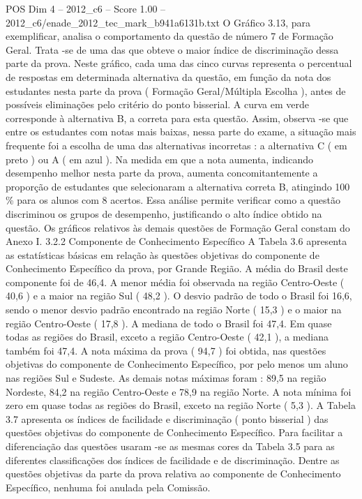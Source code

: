 \begin{textsample}{POS Dim 4 – 2012\_c6 – Score 1.00 – 2012\_c6/enade\_2012\_tec\_mark\_b941a6131b.txt}
O Gráfico 3.13, para exemplificar, analisa o comportamento da questão de número 7 de Formação Geral.
Trata -se de uma das que obteve o maior índice de discriminação dessa parte da prova.
Neste gráfico, cada uma das cinco curvas representa o percentual de respostas em determinada alternativa da questão, em função da nota dos estudantes nesta parte da prova ( Formação Geral/Múltipla Escolha ), antes de possíveis eliminações pelo critério do ponto bisserial.
A curva em verde corresponde à alternativa B, a correta para esta questão.
Assim, observa -se que entre os estudantes com notas mais baixas, nessa parte do exame, a situação mais frequente foi a escolha de uma das alternativas incorretas : a alternativa C ( em preto ) ou A ( em azul ).
Na medida em que a nota aumenta, indicando desempenho melhor nesta parte da prova, aumenta concomitantemente a proporção de estudantes que selecionaram a alternativa correta B, atingindo 100 \% para os alunos com 8 acertos.
Essa análise permite verificar como a questão discriminou os grupos de desempenho, justificando o alto índice obtido na questão.
Os gráficos relativos às demais questões de Formação Geral constam do Anexo I. 3.2.2 Componente de Conhecimento Específico A Tabela 3.6 apresenta as estatísticas básicas em relação às questões objetivas do componente de Conhecimento Específico da prova, por Grande Região.
A média do Brasil deste componente foi de 46,4.
A menor média foi observada na região Centro-Oeste ( 40,6 ) e a maior na região Sul ( 48,2 ).
O desvio padrão de todo o Brasil foi 16,6, sendo o menor desvio padrão encontrado na região Norte ( 15,3 ) e o maior na região Centro-Oeste ( 17,8 ).
A mediana de todo o Brasil foi 47,4.
Em quase todas as regiões do Brasil, exceto a região Centro-Oeste ( 42,1 ), a mediana também foi 47,4.
A nota máxima da prova ( 94,7 ) foi obtida, nas questões objetivas do componente de Conhecimento Específico, por pelo menos um aluno nas regiões Sul e Sudeste.
As demais notas máximas foram : 89,5 na região Nordeste, 84,2 na região Centro-Oeste e 78,9 na região Norte.
A nota mínima foi zero em quase todas as regiões do Brasil, exceto na região Norte ( 5,3 ).
A Tabela 3.7 apresenta os índices de facilidade e discriminação ( ponto bisserial ) das questões objetivas do componente de Conhecimento Específico.
Para facilitar a diferenciação das questões usaram -se as mesmas cores da Tabela 3.5 para as diferentes classificações dos índices de facilidade e de discriminação.
Dentre as questões objetivas da parte da prova relativa ao componente de Conhecimento Específico, nenhuma foi anulada pela Comissão.

\end{textsample}
